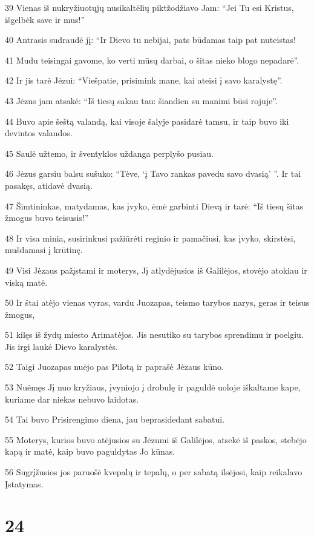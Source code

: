 \par 39 Vienas iš nukryžiuotųjų nusikaltėlių piktžodžiavo Jam: “Jei Tu esi Kristus, išgelbėk save ir mus!” 
\par 40 Antrasis sudraudė jį: “Ir Dievo tu nebijai, pats būdamas taip pat nuteistas! 
\par 41 Mudu teisingai gavome, ko verti mūsų darbai, o šitas nieko blogo nepadarė”. 
\par 42 Ir jis tarė Jėzui: “Viešpatie, prisimink mane, kai ateisi į savo karalystę”. 
\par 43 Jėzus jam atsakė: “Iš tiesų sakau tau: šiandien su manimi būsi rojuje”. 
\par 44 Buvo apie šeštą valandą, kai visoje šalyje pasidarė tamsu, ir taip buvo iki devintos valandos. 
\par 45 Saulė užtemo, ir šventyklos uždanga perplyšo pusiau. 
\par 46 Jėzus garsiu balsu sušuko: “Tėve, ‘į Tavo rankas pavedu savo dvasią’ ”. Ir tai pasakęs, atidavė dvasią. 
\par 47 Šimtininkas, matydamas, kas įvyko, ėmė garbinti Dievą ir tarė: “Iš tiesų šitas žmogus buvo teisusis!” 
\par 48 Ir visa minia, susirinkusi pažiūrėti reginio ir pamačiusi, kas įvyko, skirstėsi, mušdamasi į krūtinę. 
\par 49 Visi Jėzaus pažįstami ir moterys, Jį atlydėjusios iš Galilėjos, stovėjo atokiau ir viską matė. 
\par 50 Ir štai atėjo vienas vyras, vardu Juozapas, teismo tarybos narys, geras ir teisus žmogus, 
\par 51 kilęs iš žydų miesto Arimatėjos. Jis nesutiko su tarybos sprendimu ir poelgiu. Jis irgi laukė Dievo karalystės. 
\par 52 Taigi Juozapas nuėjo pas Pilotą ir paprašė Jėzaus kūno. 
\par 53 Nuėmęs Jį nuo kryžiaus, įvyniojo į drobulę ir paguldė uoloje iškaltame kape, kuriame dar niekas nebuvo laidotas. 
\par 54 Tai buvo Prisirengimo diena, jau beprasidedant sabatui. 
\par 55 Moterys, kurios buvo atėjusios su Jėzumi iš Galilėjos, atsekė iš paskos, stebėjo kapą ir matė, kaip buvo paguldytas Jo kūnas. 
\par 56 Sugrįžusios jos paruošė kvepalų ir tepalų, o per sabatą ilsėjosi, kaip reikalavo Įstatymas.



\chapter{24}


